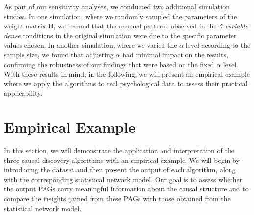 \documentclass[twoside, 11pt]{article}
\begin{document}
As part of our sensitivity analyses, we conducted two additional simulation studies. In one simulation, where we randomly sampled the parameters of the weight matrix $\mathbf{B}$, we learned that the unusual patterns observed in the \textit{5-variable dense} conditions in the original simulation were due to the specific parameter values chosen. In another simulation, where we varied the $\alpha$ level according to the sample size, we found that adjusting $\alpha$ had minimal impact on the results, confirming the robustness of our findings that were based on the fixed $\alpha$ level. With these results in mind, in the following, we will present an empirical example where we apply the algorithms to real psychological data to assess their practical applicability.



\newpage
{}
  
\section{Empirical Example} \label{emp-example}
In this section, we will demonstrate the application and interpretation of the three causal discovery algorithms with an empirical example. We will begin by introducing the dataset and then present the output of each algorithm, along with the corresponding statistical network model. Our goal is to assess whether the output PAGs carry meaningful information about the causal structure and to compare the insights gained from these PAGs with those obtained from the statistical network model.
\end{document}
